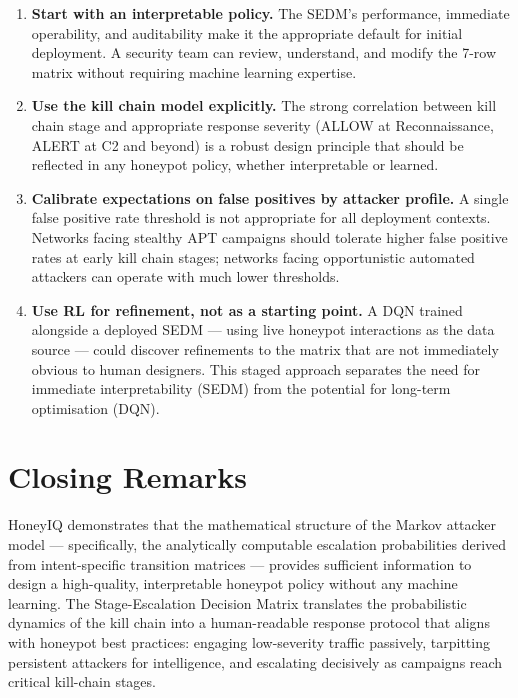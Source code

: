 \begin{enumerate}
  \item \textbf{Start with an interpretable policy.}
        The SEDM's performance, immediate operability, and auditability make
        it the appropriate default for initial deployment.
        A security team can review, understand, and modify the 7-row matrix
        without requiring machine learning expertise.

  \item \textbf{Use the kill chain model explicitly.}
        The strong correlation between kill chain stage and appropriate
        response severity (ALLOW at Reconnaissance, ALERT at C2 and beyond)
        is a robust design principle that should be reflected in any honeypot
        policy, whether interpretable or learned.

  \item \textbf{Calibrate expectations on false positives by attacker profile.}
        A single false positive rate threshold is not appropriate for all
        deployment contexts.
        Networks facing stealthy APT campaigns should tolerate higher false
        positive rates at early kill chain stages; networks facing opportunistic
        automated attackers can operate with much lower thresholds.

  \item \textbf{Use RL for refinement, not as a starting point.}
        A DQN trained alongside a deployed SEDM --- using live honeypot
        interactions as the data source --- could discover refinements to the
        matrix that are not immediately obvious to human designers.
        This staged approach separates the need for immediate interpretability
        (SEDM) from the potential for long-term optimisation (DQN).
\end{enumerate}

\section{Closing Remarks}

HoneyIQ demonstrates that the mathematical structure of the Markov attacker
model --- specifically, the analytically computable escalation probabilities
derived from intent-specific transition matrices --- provides sufficient
information to design a high-quality, interpretable honeypot policy without
any machine learning.
The Stage-Escalation Decision Matrix translates the probabilistic dynamics
of the kill chain into a human-readable response protocol that aligns with
honeypot best practices: engaging low-severity traffic passively, tarpitting
persistent attackers for intelligence, and escalating decisively as campaigns
reach critical kill-chain stages.

